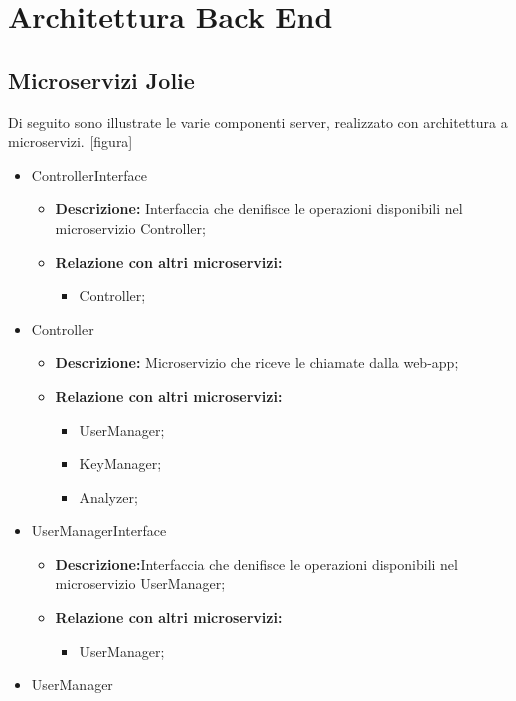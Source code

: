 \section{Architettura Back End}{

  \subsection{Microservizi Jolie}
Di seguito sono illustrate le varie componenti server, realizzato con architettura a microservizi.
[figura]

\begin{itemize}
\item ControllerInterface
  \begin{itemize}
  \item \textbf{Descrizione:} Interfaccia che denifisce le operazioni disponibili nel microservizio Controller;
    \item \textbf{Relazione con altri microservizi:}
      \begin{itemize}
      \item Controller;
      \end{itemize}
  \end{itemize}
\item Controller
  \begin{itemize}
  \item \textbf{Descrizione:} Microservizio che riceve le chiamate dalla web-app;
    \item \textbf{Relazione con altri microservizi:}
      \begin{itemize}
      \item UserManager;
        \item KeyManager;
        \item Analyzer;
      \end{itemize}
  \end{itemize}
\item UserManagerInterface
  \begin{itemize}
  \item \textbf{Descrizione:}Interfaccia che denifisce le operazioni disponibili nel microservizio UserManager;
    \item \textbf{Relazione con altri microservizi:}
      \begin{itemize}
      \item UserManager;
      \end{itemize}
  \end{itemize}
\item UserManager

\end{itemize}}
